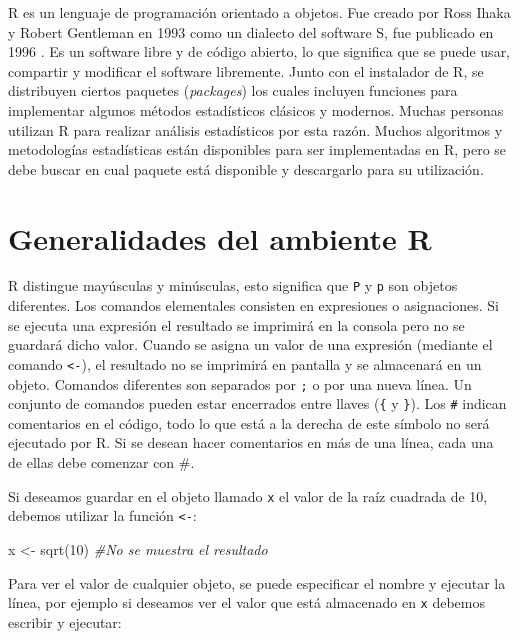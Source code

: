 \documentclass[
]{book}
\newenvironment{Shaded}{\begin{snugshade}}{\end{snugshade}}
\newcommand{\CommentTok}[1]{\textcolor[rgb]{0.56,0.35,0.01}{\textit{#1}}}
\newcommand{\DecValTok}[1]{\textcolor[rgb]{0.00,0.00,0.81}{#1}}
\newcommand{\FunctionTok}[1]{\textcolor[rgb]{0.00,0.00,0.00}{#1}}
\newcommand{\NormalTok}[1]{#1}
\newcommand{\OtherTok}[1]{\textcolor[rgb]{0.56,0.35,0.01}{#1}}
\begin{document}
R \citep{R-base} es un lenguaje de programación orientado a objetos. Fue creado por Ross Ihaka y Robert Gentleman en 1993 como un dialecto del software S, fue publicado en 1996 \citep{ihaka1996r}. Es un software libre y de código abierto, lo que significa que se puede usar, compartir y modificar el software libremente. Junto con el instalador de R, se distribuyen ciertos paquetes (\emph{packages}) los cuales incluyen funciones para implementar algunos métodos estadísticos clásicos y modernos. Muchas personas utilizan R para realizar análisis estadísticos por esta razón. Muchos algoritmos y metodologías estadísticas están disponibles para ser implementadas en R, pero se debe buscar en cual paquete está disponible y descargarlo para su utilización.

\hypertarget{SintaxisBasica}{%
\section{Generalidades del ambiente R}\label{SintaxisBasica}}

R distingue mayúsculas y minúsculas, esto significa que \texttt{P} y \texttt{p} son objetos diferentes. Los comandos elementales consisten en expresiones o asignaciones. Si se ejecuta una expresión el resultado se imprimirá en la consola pero no se guardará dicho valor. Cuando se asigna un valor de una expresión (mediante el comando \texttt{\textless{}-}), el resultado no se imprimirá en pantalla y se almacenará en un objeto. Comandos diferentes son separados por \texttt{;} o por una nueva línea. Un conjunto de comandos pueden estar encerrados entre llaves (\texttt{\{} y \texttt{\}}). Los \texttt{\#} indican comentarios en el código, todo lo que está a la derecha de este símbolo no será ejecutado por R. Si se desean hacer comentarios en más de una línea, cada una de ellas debe comenzar con \#.

Si deseamos guardar en el objeto llamado \texttt{x} el valor de la raíz cuadrada de 10, debemos utilizar la función \texttt{\textless{}-}:

\begin{Shaded}
\begin{Highlighting}[]
\NormalTok{x }\OtherTok{\textless{}{-}} \FunctionTok{sqrt}\NormalTok{(}\DecValTok{10}\NormalTok{) }\CommentTok{\#No se muestra el resultado}
\end{Highlighting}
\end{Shaded}

Para ver el valor de cualquier objeto, se puede especificar el nombre y ejecutar la línea, por ejemplo si deseamos ver el valor que está almacenado en \texttt{x} debemos escribir y ejecutar:
\end{document}

